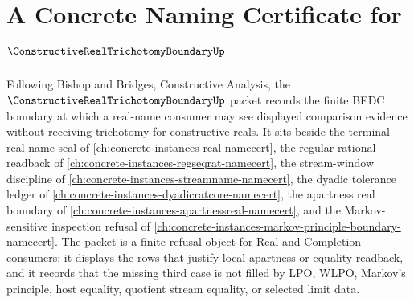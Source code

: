 \chapter{A Concrete Naming Certificate for $\ConstructiveRealTrichotomyBoundaryUp$}
\label{ch:concrete-instances-constructive-real-trichotomy-boundary-namecert}

Following Bishop and Bridges, Constructive Analysis, the $\ConstructiveRealTrichotomyBoundaryUp$ packet records the finite BEDC boundary at which a real-name consumer may see displayed comparison evidence without receiving trichotomy for constructive reals. It sits beside the terminal real-name seal of \autoref{ch:concrete-instances-real-namecert}, the regular-rational readback of \autoref{ch:concrete-instances-regseqrat-namecert}, the stream-window discipline of \autoref{ch:concrete-instances-streamname-namecert}, the dyadic tolerance ledger of \autoref{ch:concrete-instances-dyadicratcore-namecert}, the apartness real boundary of \autoref{ch:concrete-instances-apartnessreal-namecert}, and the Markov-sensitive inspection refusal of \autoref{ch:concrete-instances-markov-principle-boundary-namecert}. The packet is a finite refusal object for Real and Completion consumers: it displays the rows that justify local apartness or equality readback, and it records that the missing third case is not filled by LPO, WLPO, Markov's principle, host equality, quotient stream equality, or selected limit data.

